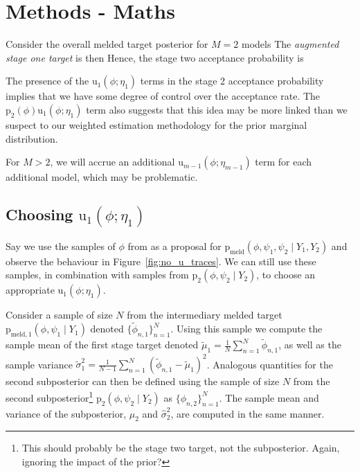 \documentclass[10pt,a4paper,]{article}
\let\rmarkdownfootnote\footnote%
\def\footnote{\protect\rmarkdownfootnote}
\newcommand{\pd}{\text{p}}
\newcommand{\tarw}{\text{u}}
\newcommand{\Nx}{N}
\newcommand{\Nm}{M}
\newcommand{\sampleindex}{n}
\newcommand{\modelindex}{m}
\begin{document}
\section{Methods - Maths}\label{methods---maths}

Consider the overall melded target posterior for \(\Nm = 2\) models
 The
\emph{augmented stage one target} is then
 Hence, the stage two
acceptance probability is


The presence of the \(\tarw_{1}(\phi; \eta_{1})\) terms in the stage 2
acceptance probability implies that we have some degree of control over
the acceptance rate. The \(\pd_{2}(\phi) \tarw_{1}(\phi; \eta_{1})\)
term also suggests that this idea may be more linked than we suspect to
our weighted estimation methodology for the prior marginal distribution.

For \(\Nm > 2\), we will accrue an additional
\(\tarw_{\modelindex - 1}(\phi; \eta_{\modelindex - 1})\) term for each
additional model, which may be problematic.

\subsection{\texorpdfstring{Choosing
\(\tarw_{1}(\phi; \eta_{1})\)}{Choosing \textbackslash{}tarw\_\{1\}(\textbackslash{}phi; \textbackslash{}eta\_\{1\})}}\label{choosing-tarw_1phi-eta_1}

Say we use the samples of \(\phi\) from
 as a proposal for
\(\pd_{\text{meld}}(\phi, \psi_{1}, \psi_{2} \mid Y_{1}, Y_{2})\) and
observe the behaviour in Figure~\ref{fig:no_u_traces}. We can still use
these samples, in combination with samples from
\(\pd_{2}(\phi, \psi_{2} \mid Y_{2})\), to choose an appropriate
\(\tarw_{1}(\phi; \eta_{1})\).

Consider a sample of size \(\Nx\) from the intermediary melded target
\(\pd_{\text{meld}, 1}(\phi, \psi_{1} \mid Y_{1})\) denoted
\(\{\tilde{\phi}_{\sampleindex, 1}\}_{\sampleindex = 1}^{\Nx}\). Using
this sample we compute the sample mean of the first stage target denoted
\(\tilde{\mu}_{1} = \frac{1}{\Nx}\sum\limits_{\sampleindex = 1}^{\Nx}\tilde{\phi}_{\sampleindex, 1}\),
as well as the sample variance
\(\tilde{\sigma}^{2}_{1} = \frac{1}{\Nx - 1}\sum\limits_{\sampleindex = 1}^{\Nx} (\tilde{\phi}_{\sampleindex, 1} - \tilde{\mu}_{1})^{2}\).
Analogous quantities for the second subposterior can then be defined
using the sample of size \(\Nx\) from the second subposterior\footnote{This
  should probably be the stage two target, not the subposterior. Again,
  ignoring the impact of the prior?}
\(\pd_{2}(\phi, \psi_{2} \mid Y_{2})\) as
\(\{\phi_{\sampleindex, 2}\}_{\sampleindex = 1}^{\Nx}\). The sample mean
and variance of the subposterior, \(\hat{\mu}_{2}\) and
\(\hat{\sigma}^{2}_{2}\), are computed in the same manner.
\end{document}
